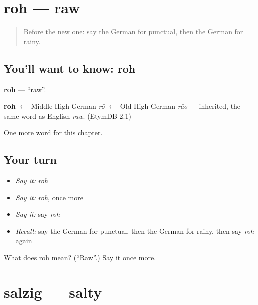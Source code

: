 \section[roh]{roh — raw}

\label{lesson:GE-C220-roh}



\begin{quote}
Before the new one: say the German for punctual, then the German for rainy.
\end{quote}

\subsection*{You'll want to know: roh}
\textbf{roh} — \textquotedblleft{}raw\textquotedblright{}.

\begin{cousinweb}
\textbf{roh} $\leftarrow$ Middle High German \emph{rō} $\leftarrow$ Old High German \emph{rāo} — inherited, the same word as English \emph{raw}. (EtymDB 2.1)
\end{cousinweb}

\begin{grammarlens}[title={What you've built}]
One more word for this chapter.
\end{grammarlens}

\subsection*{Your turn}
\begin{itemize}
\raggedright
  \item \emph{Say it:} \emph{roh}
  \item \emph{Say it:} \emph{roh}, once more
  \item \emph{Say it:} say \emph{roh}
  \item \emph{Recall:} say the German for punctual, then the German for rainy, then say \emph{roh} again
\end{itemize}

\begin{tcolorbox}[breakable,colback=teal!4,colframe=teal!35!black,title={Before you move on}]
What does roh mean? (\textquotedblleft{}Raw\textquotedblright{}.) Say it once more.
\end{tcolorbox}
\section[salzig]{salzig — salty}

